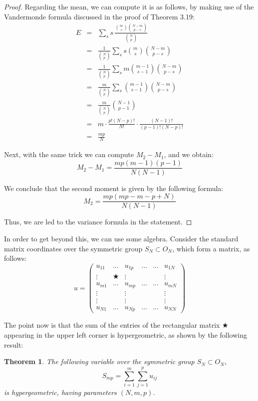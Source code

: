 \documentclass[12pt]{amsbook}
\newtheorem{theorem}{Theorem}[chapter]
\begin{document}
\begin{proof}
Regarding the mean, we can compute it is as follows, by making use of the Vandermonde formula discussed in the proof of Theorem 3.19:
\begin{eqnarray*}
E
&=&\sum_ss\,\frac{\binom{m}{s}\binom{N-m}{p-s}}{\binom{N}{p}}\\
&=&\frac{1}{\binom{N}{p}}\sum_ss\binom{m}{s}\binom{N-m}{p-s}\\
&=&\frac{1}{\binom{N}{p}}\sum_sm\binom{m-1}{s-1}\binom{N-m}{p-s}\\
&=&\frac{m}{\binom{N}{p}}\sum_s\binom{m-1}{s-1}\binom{N-m}{p-s}\\
&=&\frac{m}{\binom{N}{p}}\binom{N-1}{p-1}\\
&=&m\cdot\frac{p!(N-p)!}{N!}\cdot\frac{(N-1)!}{(p-1)!(N-p)!}\\
&=&\frac{mp}{N}
\end{eqnarray*}

Next, with the same trick we can compute $M_2-M_1$, and we obtain:
$$M_2-M_1=\frac{mp(m-1)(p-1)}{N(N-1)}$$

We conclude that the second moment is given by the following formula:
$$M_2=\frac{mp(mp-m-p+N)}{N(N-1)}$$

Thus, we are led to the variance formula in the statement.
\end{proof}

In order to get beyond this, we can use some algebra. Consider the standard matrix coordinates over the symmetric group $S_N\subset O_N$, which form a matrix, as follows:
$$u=\begin{pmatrix}
u_{11}&\ldots&u_{1p}&\ldots&\ldots&u_{1N}\\
\vdots&\bigstar&\vdots&&&\vdots\\
u_{m1}&\ldots&u_{mp}&\ldots&\ldots&u_{mN}\\
\vdots&&\vdots&&&\vdots\\
\vdots&&\vdots&&&\vdots\\
u_{N1}&\ldots&u_{Np}&\ldots&\ldots&u_{NN}
\end{pmatrix}$$

The point now is that the sum of the entries of the rectangular matrix $\bigstar$ appearing in the upper left corner is hypergeometric, as shown by the following result:


\begin{theorem}
The following variable over the symmetric group $S_N\subset O_N$,
$$S_{mp}=\sum_{i=1}^m\sum_{j=1}^pu_{ij}$$
is hypergeometric, having parameters $(N,m,p)$.
\end{theorem}
\end{document}
